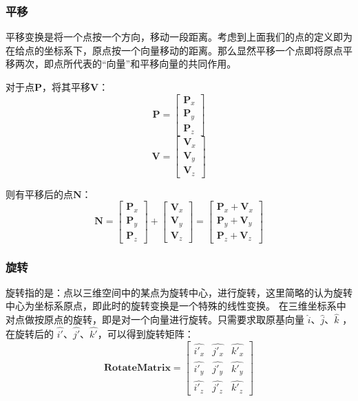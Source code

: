 \documentclass[12pt,oneside,a4paper]{ctexart}
\begin{document}
\subsubsection{平移}
平移变换是将一个点按一个方向，移动一段距离。考虑到上面我们的点的定义即为在给点的坐标系下，原点按一个向量移动的距离。那么显然平移一个点即将原点平移两次，即点所代表的“向量”和平移向量的共同作用。

对于点$\mathbf{P}$，将其平移$\mathbf{V}$：
\begin{equation*}
	\mathbf{P}=
	\begin{bmatrix}
		\mathbf{P}_x \\
		\mathbf{P}_y \\
		\mathbf{P}_z
	\end{bmatrix}
\end{equation*}
\begin{equation*}
	\mathbf{V}=
	\begin{bmatrix}
		\mathbf{V}_x \\
		\mathbf{V}_y \\
		\mathbf{V}_z
	\end{bmatrix}
\end{equation*}

则有平移后的点$\mathbf{N}$：
\begin{equation*}
	\mathbf{N}=
	\begin{bmatrix}
		\mathbf{P}_x \\
		\mathbf{P}_y \\
		\mathbf{P}_z
	\end{bmatrix}+\begin{bmatrix}
		\mathbf{V}_x \\
		\mathbf{V}_y \\
		\mathbf{V}_z
	\end{bmatrix} =
	\begin{bmatrix}
		\mathbf{P}_x + \mathbf{V}_x \\
		\mathbf{P}_y + \mathbf{V}_y \\
		\mathbf{P}_z + \mathbf{V}_z
	\end{bmatrix}
\end{equation*}
\subsubsection{旋转}
旋转指的是：点以三维空间中的某点为旋转中心，进行旋转，这里简略的认为旋转中心为坐标系原点，即此时的旋转变换是一个特殊的线性变换。
在三维坐标系中对点做按原点的旋转，即是对一个向量进行旋转。只需要求取原基向量 $\hat{i}$、$\hat{j}$、$\hat{k}$ ，在旋转后的 $\hat{i'}$、$\hat{j'}$、$\hat{k'}$，可以得到旋转矩阵：
\begin{equation*}
	\mathbf{RotateMatrix} =
	\begin{bmatrix}
		\hat{i'_x} & \hat{j'_x} & \hat{k'_x} \\
		\hat{i'_y} & \hat{j'_y} & \hat{k'_y} \\
		\hat{i'_z} & \hat{j'_z} & \hat{k'_z}
	\end{bmatrix}
\end{equation*}
\end{document}
